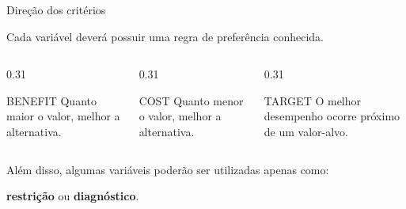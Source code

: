 \begin{frame}{Direção dos critérios}

    Cada variável deverá possuir uma regra de preferência conhecida.

    \vspace{0.3cm}

    \begin{columns}[T]

        \begin{column}{0.31\textwidth}

            \begin{block}{BENEFIT}
                Quanto maior o valor, melhor a alternativa.
            \end{block}

        \end{column}


        \begin{column}{0.31\textwidth}

            \begin{block}{COST}
                Quanto menor o valor, melhor a alternativa.
            \end{block}

        \end{column}


        \begin{column}{0.31\textwidth}

            \begin{block}{TARGET}
                O melhor desempenho ocorre próximo de um valor-alvo.
            \end{block}

        \end{column}

    \end{columns}

    \vspace{0.4cm}

    Além disso, algumas variáveis poderão ser utilizadas apenas como:

    \begin{center}
        \textbf{restrição}
        \qquad ou \qquad
        \textbf{diagnóstico}.
    \end{center}

\end{frame}



